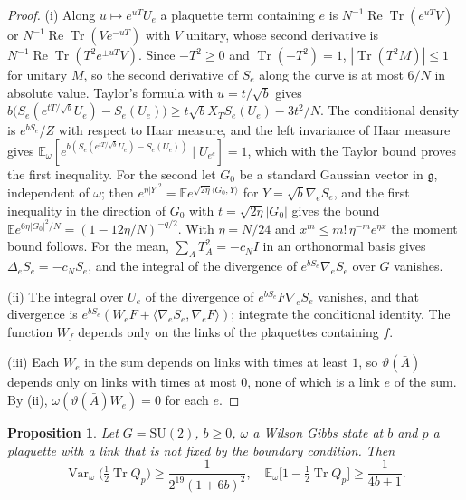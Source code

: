 \documentclass[11pt]{amsart}
\newtheorem{proposition}[theorem]{Proposition}
\theoremstyle{definition}
\theoremstyle{remark}
\numberwithin{equation}{section}
\newcommand{\E}{\mathbb{E}}
\newcommand{\SU}{\mathrm{SU}}
\newcommand{\g}{\mathfrak{g}}
\newcommand{\Tr}{\operatorname{Tr}}
\newcommand{\ReTr}{\operatorname{Re}\operatorname{Tr}}
\newcommand{\Var}{\operatorname{Var}}
\newcommand{\ip}[2]{\langle #1,#2\rangle}
\begin{document}
\begin{proof}
(i) Along $u\mapsto e^{uT}U_e$ a plaquette term containing $e$ is
$N^{-1}\ReTr(e^{uT}V)$ or $N^{-1}\ReTr(Ve^{-uT})$ with $V$ unitary, whose
second derivative is $N^{-1}\ReTr(T^2e^{\pm uT}V)$. Since $-T^2\ge0$ and
$\Tr(-T^2)=1$, $|\Tr(T^2M)|\le1$ for unitary $M$, so the second derivative of
$S_e$ along the curve is at most $6/N$ in absolute value. Taylor's formula with
$u=t/\sqrt b$ gives
$b\bigl(S_e(e^{tT/\sqrt b}U_e)-S_e(U_e)\bigr)\ge t\sqrt bX_TS_e(U_e)-3t^2/N$.
The conditional density is $e^{bS_e}/Z$ with respect to Haar measure, and the
left invariance of Haar measure gives
$\E_\omega[e^{b(S_e(e^{tT/\sqrt b}U_e)-S_e(U_e))}\mid U_{e^c}]=1$, which with
the Taylor bound proves the first inequality. For the second let $G_0$ be a
standard Gaussian vector in $\g$, independent of $\omega$; then
$e^{\eta|Y|^2}=\E e^{\sqrt{2\eta}\ip{G_0}Y}$ for $Y=\sqrt b\nabla_eS_e$, and the
first inequality in the direction of $G_0$ with $t=\sqrt{2\eta}|G_0|$ gives
the bound $\E e^{6\eta|G_0|^2/N}=(1-12\eta/N)^{-q/2}$. With $\eta=N/24$ and
$x^m\le m!\,\eta^{-m}e^{\eta x}$ the moment bound follows. For the mean,
$\sum_AT_A^2=-c_NI$ in an orthonormal basis gives $\Delta_eS_e=-c_NS_e$, and the
integral of the divergence of $e^{bS_e}\nabla_eS_e$ over $G$ vanishes.

(ii) The integral over $U_e$ of the divergence of $e^{bS_e}F\nabla_eS_e$
vanishes, and that divergence is $e^{bS_e}(W_eF+\ip{\nabla_eS_e}{\nabla_eF})$;
integrate the conditional identity. The function $W_f$ depends only on the
links of the plaquettes containing $f$.

(iii) Each $W_e$ in the sum depends on links with times at least $1$, so
$\vartheta(\bar A)$ depends only on links with times at most $0$, none of which
is a link $e$ of the sum. By (ii), $\omega(\vartheta(\bar A)W_e)=0$ for each $e$.
\end{proof}

\begin{proposition}\label{prop:plaqvar}
Let $G=\SU(2)$, $b\ge0$, $\omega$ a Wilson Gibbs state at $b$ and $p$ a
plaquette with a link that is not fixed by the boundary condition. Then
\[
\Var_\omega\bigl(\tfrac12\Tr Q_p\bigr)\ge\frac1{2^{19}(1+6b)^2},\quad
\E_\omega\bigl[1-\tfrac12\Tr Q_p\bigr]\ge\frac1{4b+1}.
\]
\end{proposition}
\end{document}
